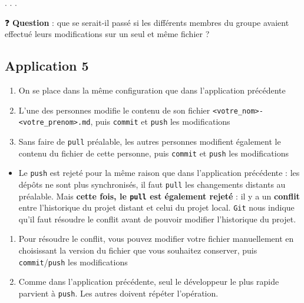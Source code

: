 \documentclass[
  letterpaper,
  DIV=11,
  numbers=noendperiod]{scrartcl}
\providecommand{\tightlist}{%
  \setlength{\itemsep}{0pt}\setlength{\parskip}{0pt}}\usepackage{longtable,booktabs,array}
\begin{document}
. . .

❓ \textbf{Question} : que se serait-il passé si les différents membres
du groupe avaient effectué leurs modifications sur un seul et même
fichier ?

\hypertarget{application-5}{%
\subsection{Application 5}\label{application-5}}

\begin{tcolorbox}[enhanced jigsaw, colframe=quarto-callout-tip-color-frame, rightrule=.15mm, breakable, colbacktitle=quarto-callout-tip-color!10!white, coltitle=black, toptitle=1mm, title={Résoudre les conflits}, titlerule=0mm, leftrule=.75mm, colback=white, bottomrule=.15mm, bottomtitle=1mm, toprule=.15mm, opacitybacktitle=0.6, arc=.35mm, left=2mm, opacityback=0]

\begin{enumerate}
\def\labelenumi{\arabic{enumi}.}
\tightlist
\item
  On se place dans la même configuration que dans l'application
  précédente
\item
  L'une des personnes modifie le contenu de son fichier
  \texttt{\textless{}votre\_nom\textgreater{}-\textless{}votre\_prenom\textgreater{}.md},
  puis \texttt{commit} et \texttt{push} les modifications
\item
  Sans faire de \texttt{pull} préalable, les autres personnes modifient
  également le contenu du fichier de cette personne, puis
  \texttt{commit} et \texttt{push} les modifications
\end{enumerate}

\begin{itemize}
\tightlist
\item
  Le \texttt{push} est rejeté pour la même raison que dans l'application
  précédente : les dépôts ne sont plus synchronisés, il faut
  \texttt{pull} les changements distants au préalable. Mais
  \textbf{cette fois, le \texttt{pull} est également rejeté} : il y a un
  \textbf{conflit} entre l'historique du projet distant et celui du
  projet local. \texttt{Git} nous indique qu'il faut résoudre le conflit
  avant de pouvoir modifier l'historique du projet.
\end{itemize}

\begin{enumerate}
\def\labelenumi{\arabic{enumi}.}
\setcounter{enumi}{4}
\tightlist
\item
  Pour résoudre le conflit, vous pouvez modifier votre fichier
  manuellement en choisissant la version du fichier que vous souhaitez
  conserver, puis \texttt{commit}/\texttt{push} les modifications
\item
  Comme dans l'application précédente, seul le développeur le plus
  rapide parvient à \texttt{push}. Les autres doivent répéter
  l'opération.
\end{enumerate}

\end{tcolorbox}
\end{document}
